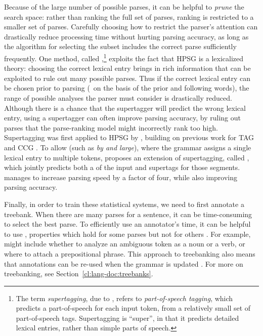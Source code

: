 \documentclass[output=paper,nonflat]{langsci/langscibook}
\begin{document}
Because of the large number of possible parses,
it can be helpful to \textit{prune} the search space:
rather than ranking the full set of parses,
ranking is restricted to a smaller set of parses.
Carefully choosing how to restrict the parser's attention 
can drastically reduce processing time without hurting parsing accuracy,
as long as the algorithm for selecting the subset
includes the correct parse sufficiently frequently.
One method, called \textit{},\footnote{%
	The term \textit{supertagging}, due to \citet{bangalore1999supertag},
	refers to \textit{part-of-speech tagging},
	which predicts a part-of-speech for each input token,
	from a relatively small set of part-of-speech tags.
	Supertagging is ``super'', in that it predicts detailed lexical entries,
	rather than simple parts of speech.
}
exploits the fact that HPSG is a lexicalized theory:
choosing the correct lexical entry brings in rich information
that can be exploited to rule out many possible parses.
Thus if the correct lexical entry can be chosen prior to parsing
(\eg\ on the basis of the prior and following words),
the range of possible analyses the parser must consider is drastically reduced.
Although there is a chance that the supertagger will predict the wrong lexical entry,
using a supertagger can often improve parsing accuracy,
by ruling out parses that the parse-ranking model might incorrectly rank too high.
Supertagging was first applied to HPSG by \citet{matsuzaki2007supertag},
building on previous work for TAG \citep{bangalore1999supertag}
and CCG \citep{clark2004supertag}.
To allow  (such as \textit{by and large}),
where the grammar assigns a single lexical entry to multiple tokens,
\citet{dridan2013ubertag} proposes an extension of supertagging, called \textit{},
which jointly predicts both a  of the input and supertags for those segments.
\citeauthor{dridan2013ubertag} manages to increase parsing speed by a factor of four,
while also improving parsing accuracy.


Finally, in order to train these statistical systems,
we need to first annotate a treebank.
When there are many parses for a sentence,
it can be time-consuming to select the best parse.
To efficiently use an annotator's time,
it can be helpful to use \textit{},
properties which hold for some parses but not for others \citep{Carter:97}.
For example,  might include
whether to analyze an ambiguous token as a noun or a verb,
or where to attach a prepositional phrase.
This approach to treebanking also means that
annotations can be re-used when the grammar is updated
\citep{OFTM2004a-u,Fli:Oep:Ben:17}. For more on treebanking, see Section~\ref{cl:lang-doc:treebanks}.
\end{document}
